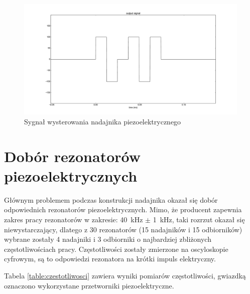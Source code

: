  \begin{figure}[h!]
    \centering
    \includegraphics[width=1.15\textwidth, trim= 47mm 0mm 0mm 0mm,clip]{output_signal}
    \caption{Sygnał wysterowania nadajnika piezoelektrycznego}
    \label{fig:output_signal}
\end{figure}

\newpage

\section{Dobór rezonatorów piezoelektrycznych}

Głównym problemem podczas konstrukcji nadajnika okazał się dobór odpowiednich rezonatorów piezoelektrycznych.
Mimo, że producent zapewnia zakres pracy rezonatorów w zakresie: \SI{40}{kHz} $\pm$ \SI{1}{kHz}, taki rozrzut okazał się niewystarczający, 
dlatego z 30 rezonatorów (15 nadajników i 15 odbiorników) wybrane zostały 4 nadajniki i 3 odbiorniki o najbardziej 
zbliżonych częstotliwościach pracy. Częstotliwości zostały zmierzone na oscyloskopie cyfrowym, są to odpowiedzi 
rezonatora na krótki impuls elektryczny.

Tabela \ref{table:czestotliwosci} zawiera wyniki pomiarów częstotliwości, gwiazdką oznaczono wykorzystane przetworniki piezoelektryczne.

